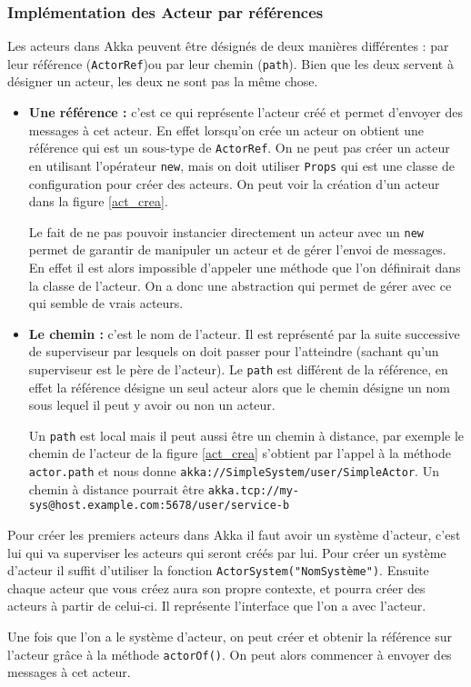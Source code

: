 \documentclass[11pt, a4paper]{article}
\begin{document}
\subsubsection{Implémentation des Acteur par références}
Les acteurs dans Akka peuvent être désignés de deux manières différentes : par leur référence (\texttt{ActorRef})ou par leur chemin (\texttt{path}). Bien que les deux servent à désigner un acteur, les deux ne sont pas la même chose. 
\begin{itemize}
\item \textbf{Une référence :} c'est ce qui représente l'acteur créé et permet d'envoyer des messages à cet acteur. En effet lorsqu'on crée un acteur on obtient une référence qui est un sous-type de \texttt{ActorRef}. On ne peut pas créer un acteur en utilisant l'opérateur \texttt{new}, mais on doit utiliser \texttt{Props} qui est une classe de configuration pour créer des acteurs. On peut voir la création d'un acteur dans la figure \ref{act_crea}.
\par Le fait de ne pas pouvoir instancier directement un acteur avec un \texttt{new} permet de garantir de manipuler un acteur et de gérer l'envoi de messages. En effet il est alors impossible d'appeler une méthode que l'on définirait dans la classe de l'acteur. On a donc une abstraction qui permet de gérer avec ce qui semble de vrais acteurs. 
\item \textbf{Le chemin :} c'est le nom de l'acteur. Il est représenté par la suite successive de superviseur par lesquels on doit passer pour l'atteindre (sachant qu'un superviseur est le père de l'acteur). Le \texttt{path} est différent de la référence, en effet la référence désigne un seul acteur alors que le chemin désigne un nom sous lequel il peut y avoir ou non un acteur.
\par Un \texttt{path} est local mais il peut aussi être un chemin à distance, par exemple le chemin de l'acteur de la figure \ref{act_crea} s'obtient par l'appel à la méthode \texttt{actor.path} et nous donne \texttt{akka://SimpleSystem/user/SimpleActor}. Un chemin à distance pourrait être \texttt{akka.tcp://my-sys@host.example.com:5678/user/service-b}
\newline
\end{itemize}
\par 
Pour créer les premiers acteurs dans Akka il faut avoir un système d'acteur, c'est lui qui va superviser les acteurs qui seront créés par lui. Pour créer un système d'acteur il suffit d'utiliser la fonction \texttt{ActorSystem("NomSystème")}. Ensuite chaque acteur que vous créez aura son propre contexte, et pourra créer des acteurs à partir de celui-ci. Il représente l'interface que l'on a avec l'acteur. 
\par Une fois que l'on a le système d'acteur, on peut créer et obtenir la référence sur l'acteur grâce à la méthode \texttt{actorOf()}. On peut alors commencer à envoyer des messages à cet acteur.
\end{document}
